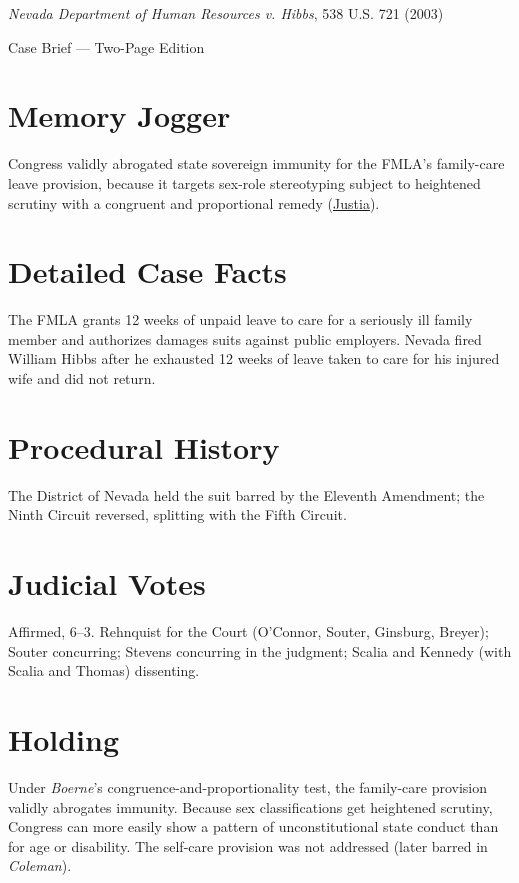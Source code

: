 \documentclass[12pt]{article}
\begin{document}
\begin{center}
{\LARGE \textit{Nevada Department of Human Resources v. Hibbs}, 538 U.S. 721 (2003)\par}
\vspace{0.5em}
{\large Case Brief --- Two-Page Edition\par}
\end{center}

\section{Memory Jogger}
Congress validly abrogated state sovereign immunity for the FMLA's family-care leave provision, because it targets sex-role stereotyping subject to heightened scrutiny with a congruent and proportional remedy (\href{https://supreme.justia.com/cases/federal/us/538/721/}{Justia}).

\section{Detailed Case Facts}
The FMLA grants 12 weeks of unpaid leave to care for a seriously ill family member and authorizes damages suits against public employers. Nevada fired William Hibbs after he exhausted 12 weeks of leave taken to care for his injured wife and did not return.

\section{Procedural History}
The District of Nevada held the suit barred by the Eleventh Amendment; the Ninth Circuit reversed, splitting with the Fifth Circuit.

\section{Judicial Votes}
Affirmed, 6--3. Rehnquist for the Court (O'Connor, Souter, Ginsburg, Breyer); Souter concurring; Stevens concurring in the judgment; Scalia and Kennedy (with Scalia and Thomas) dissenting.

\section{Holding}
Under \textit{Boerne}'s congruence-and-proportionality test, the family-care provision validly abrogates immunity. Because sex classifications get heightened scrutiny, Congress can more easily show a pattern of unconstitutional state conduct than for age or disability. The self-care provision was not addressed (later barred in \textit{Coleman}).
\end{document}
